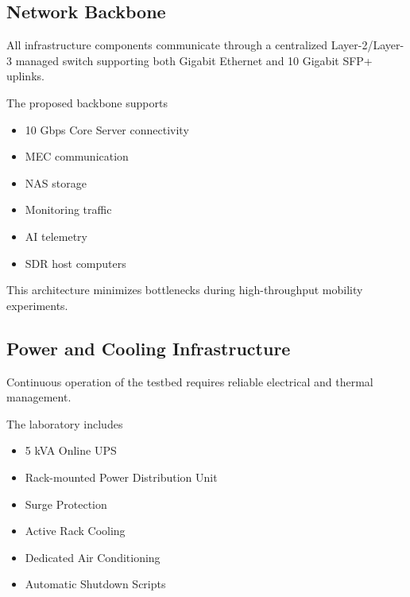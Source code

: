 \documentclass[12pt,a4paper]{article}\usepackage[a4paper,margin=1in]{geometry}\usepackage{graphicx}\usepackage{longtable}\usepackage{booktabs}\usepackage{hyperref}\usepackage{enumitem}\usepackage{amsmath}\usepackage{tikz}\usepackage{pgfgantt}\usepackage{setspace}\setstretch{1.15}\usetikzlibrary{positioning,arrows.meta,shapes.geometric}
\begin{document}
	
	\subsection{Network Backbone}
	
	All infrastructure components communicate through a centralized Layer-2/Layer-3 managed switch supporting both Gigabit Ethernet and 10 Gigabit SFP+ uplinks.
	
	The proposed backbone supports
	
	\begin{itemize}
		
		\item 10 Gbps Core Server connectivity
		
		\item MEC communication
		
		\item NAS storage
		
		\item Monitoring traffic
		
		\item AI telemetry
		
		\item SDR host computers
		
	\end{itemize}
	
	This architecture minimizes bottlenecks during high-throughput mobility experiments.
	
	
	\subsection{Power and Cooling Infrastructure}
	
	Continuous operation of the testbed requires reliable electrical and thermal management.
	
	The laboratory includes
	
	\begin{itemize}
		
		\item 5 kVA Online UPS
		
		\item Rack-mounted Power Distribution Unit
		
		\item Surge Protection
		
		\item Active Rack Cooling
		
		\item Dedicated Air Conditioning
		
		\item Automatic Shutdown Scripts
		
	\end{itemize}
	
\end{document}
